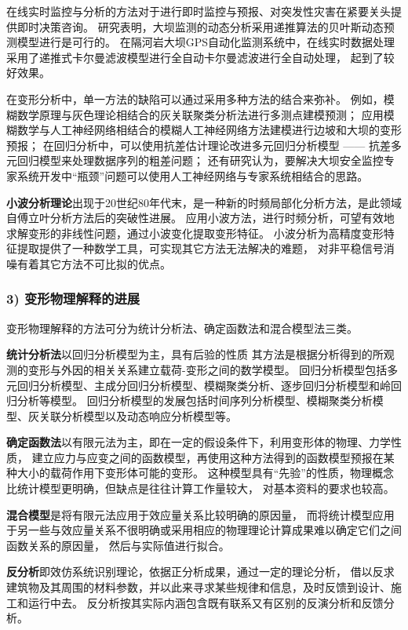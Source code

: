 在线实时监控与分析的方法对于进行即时监控与预报、对突发性灾害在紧要关头提供即时决策咨询。
研究表明，大坝监测的动态分析采用递推算法的贝叶斯动态预测模型进行是可行的。
在隔河岩大坝GPS自动化监测系统中，在线实时数据处理采用了递推式卡尔曼滤波模型进行全自动卡尔曼滤波进行全自动处理，
起到了较好效果。

在变形分析中，单一方法的缺陷可以通过采用多种方法的结合来弥补。
例如，模糊数学原理与灰色理论相结合的灰关联聚类分析法进行多测点建模预测；
应用模糊数学与人工神经网络相结合的模糊人工神经网络方法建模进行边坡和大坝的变形预报；
在回归分析中，可以使用抗差估计理论改进多元回归分析模型 —— 抗差多元回归模型来处理数据序列的粗差问题；
还有研究认为，要解决大坝安全监控专家系统开发中“瓶颈”问题可以使用人工神经网络与专家系统相结合的思路。

\textbf{小波分析理论}出现于20世纪80年代末，是一种新的时频局部化分析方法，是此领域自傅立叶分析方法后的突破性进展。
应用小波方法，进行时频分析，可望有效地求解变形的非线性问题，通过小波变化提取变形特征。
小波分析为高精度变形特征提取提供了一种数学工具，可实现其它方法无法解决的难题，
对非平稳信号消噪有着其它方法不可比拟的优点。

\subsubsection*{3) 变形物理解释的进展}
变形物理解释的方法可分为统计分析法、确定函数法和混合模型法三类。

\textbf{统计分析法}以回归分析模型为主，具有后验的性质
其方法是根据分析得到的所观测的变形与外因的相关关系建立载荷-变形之间的数学模型。
回归分析模型包括多元回归分析模型、主成分回归分析模型、模糊聚类分析、逐步回归分析模型和岭回归分析等模型。
回归分析模型的发展包括时间序列分析模型、模糊聚类分析模型、灰关联分析模型以及动态响应分析模型等。

\textbf{确定函数法}以有限元法为主，即在一定的假设条件下，利用变形体的物理、力学性质，
建立应力与应变之间的函数模型，再使用这种方法得到的函数模型预报在某种大小的载荷作用下变形体可能的变形。
这种模型具有“先验”的性质，物理概念比统计模型更明确，但缺点是往往计算工作量较大，
对基本资料的要求也较高。

\textbf{混合模型}是将有限元法应用于效应量关系比较明确的原因量，
而将统计模型应用于另一些与效应量关系不很明确或采用相应的物理理论计算成果难以确定它们之间函数关系的原因量，
然后与实际值进行拟合。

\textbf{反分析}即效仿系统识别理论，依据正分析成果，通过一定的理论分析，
借以反求建筑物及其周围的材料参数，并以此来寻求某些规律和信息，及时反馈到设计、施工和运行中去。
反分析按其实际内涵包含既有联系又有区别的反演分析和反馈分析。

